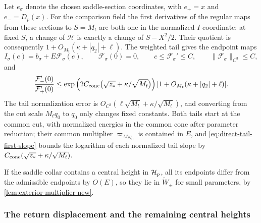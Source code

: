Let \(e_\sigma\) denote the chosen saddle-section coordinates,
with \(e_+=x\) and \(e_-=D_p(x)\). For the comparison field the first
derivatives of the regular maps from these sections to \(S=M_t\) are
both one in the normalized \(I\) coordinate:
at fixed \(S\), a change of \(\mathscr H\) is exactly a change
of \(S-X^2/2\). Their quotient is consequently
\(1+O_{M_t}(\kappa+|q_2|+\ell)\).
The weighted tail gives the endpoint maps
\begin{equation}
\label{eq:direct-positive-endpoints}
 I_\sigma(e)=b_\sigma+E\mathcal F_\sigma(e),\qquad \mathcal F_\sigma(0)=0,\qquad
 c\le\mathcal F_\sigma'\le C,\qquad \|\mathcal F_\sigma\|_{C^3}\le C,
\end{equation}
and
\begin{equation}
\label{eq:direct-positive-slope-quotient}
 \frac{\mathcal F_-'(0)}{\mathcal F_+'(0)}
 \le \exp\left(2C_{\rm cone}\bigl(\sqrt{z_*}+\kappa/\sqrt{M_t}\bigr)\right)
         [1+O_{M_t}(\kappa+|q_2|+\ell)].
\end{equation}
The tail normalization error is
\(O_{C^3}(\ell\sqrt{M_t}+\kappa/\sqrt{M_t})\), and converting from the
cut scale \(M_tq_0\) to \(q_0\) only changes fixed constants. Both tails
start at the common cut, with normalized energies in the common cone
after parameter reduction; their common multiplier \(\varpi_{M_tq_0}\) is
contained in \(E\), and \eqref{eq:direct-tail-first-slope} bounds the
logarithm of each normalized tail slope by
\(C_{\rm cone}(\sqrt{z_*}+\kappa/\sqrt{M_t})\).

If the saddle collar contains a central height in \(\mathcal H_p\), all its
endpoints differ from the admissible endpoints by \(O(E)\), so they lie
in \(\widetilde W_\pm\) for small parameters, by
\cref{lem:exterior-multiplier-new}.

\subsubsection{The return displacement and the remaining central heights}

